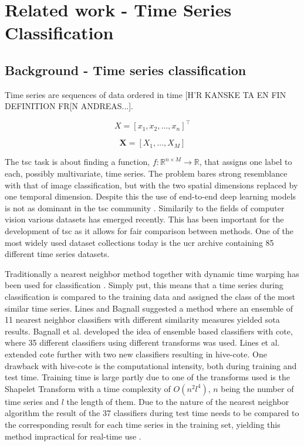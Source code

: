 \chapter{Related work - Time Series Classification} \label{sec:tsc}
\section{Background - Time series classification}
Time series are sequences of data ordered in time [H'R KANSKE TA EN FIN DEFINITION FR[N ANDREAS...].

\begin{definition}
  $$X = \left[x_1, x_2, \hdots, x_n\right]^\intercal$$
  \label{def:uts}
\end{definition}

\begin{definition}
    $$\pmb{X} = \left[X_1, \hdots, X_M\right]$$
\end{definition}

The \gls{tsc} task is about finding a function, $f: \mathbb{R}^{n \times M} \rightarrow \mathbb{R}$, that assigns one label to each, possibly multivariate, time series. The problem bares strong resemblance with that of image classification, but with the two spatial dimensions replaced by one temporal dimension. Despite this the use of end-to-end deep learning models is not as dominant in the \gls{tsc} community \cite{IsmailFawaz2019}. Similarily to the fields of computer vision various datasets has emerged recently. This has been important for the development of \gls{tsc} as it allows for fair comparison between methods. One of the most widely used dataset collections today is the \gls{ucr} archive \cite{Dau2018} containing 85 different time series datasets.

Traditionally a nearest neighbor method together with dynamic time warping has been used for classification \cite{Bagnall2017}. Simply put, this means that a time series during classification is compared to the training data and assigned the class of the most similar time series. Lines and Bagnall suggested a method where an ensemble of 11 nearest neighbor classifiers with different similarity measures \cite{Lines2015} yielded \gls{sota} results. Bagnall et al. \cite{Bagnall2015} developed the idea of ensemble based classifiers with \gls{cote}, where 35 different classifiers using different transforms was used. Lines et al. \cite{Lines2016} extended \gls{cote} further with two new classifiers resulting in \gls{hive-cote}. One drawback with \gls{hive-cote} is the computational intensity, both during training and test time. Training time is large partly due to one of the transforms used is the Shapelet Transform with a time complexity of $O(n^2l^4)$, $n$ being the number of time series and $l$ the length of them. Due to the nature of the nearest neighbor algorithm the result of the 37 classifiers during test time needs to be compared to the corresponding result for each time series in the training set, yielding this method impractical for real-time use \cite{IsmailFawaz2019}.


